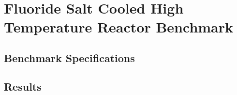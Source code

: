 \chapter{Fluoride Salt Cooled High Temperature Reactor Benchmark}

\section{Benchmark Specifications}

\section{Results}